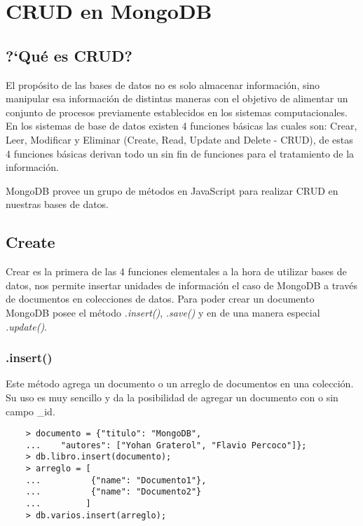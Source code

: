 \chapter{CRUD en MongoDB}

\section{?`Qu\'e es CRUD?}

El prop\'osito de las bases de datos no es solo almacenar informaci\'on, sino manipular esa informaci\'on de distintas maneras con el objetivo de alimentar un conjunto de procesos previamente establecidos en los sistemas computacionales. En los sistemas de base de datos existen 4 funciones b\'asicas las cuales son: Crear, Leer, Modificar y Eliminar (Create, Read, Update and Delete - CRUD), de estas 4 funciones b\'asicas derivan todo un sin fin de funciones para el tratamiento de la informaci\'on.

MongoDB provee un grupo de m\'etodos en JavaScript para realizar CRUD en nuestras bases de datos. 

\section{Create}

Crear es la primera de las 4 funciones elementales a la hora de utilizar bases de datos, nos permite insertar unidades de informaci\'on el caso de MongoDB a trav\'es de documentos en colecciones de datos. Para poder crear un documento MongoDB posee el m\'etodo \textit{.insert()}, \textit{.save()} y en de una manera especial \textit{.update()}.

\subsection{.insert()}

Este m\'etodo agrega un documento o un arreglo de documentos en una colecci\'on. Su uso es muy sencillo y da la posibilidad de agregar un documento con o sin campo \_id.

\begin{lstlisting}
    > documento = {"titulo": "MongoDB",
    ...    "autores": ["Yohan Graterol", "Flavio Percoco"]};
    > db.libro.insert(documento);
    > arreglo = [
    ...          {"name": "Documento1"},
    ...          {"name": "Documento2"}
    ...         ]
    > db.varios.insert(arreglo);
\end{lstlisting}


